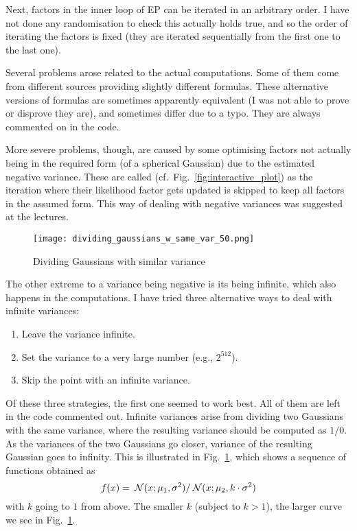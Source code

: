 \documentclass[11pt]{article}
\begin{document}
Next, factors in the inner loop of EP can be iterated in an arbitrary 
order. I have not done any randomisation to check this actually holds true, 
and so the order of iterating the factors is fixed (they are iterated 
sequentially from the first one to the last one).

Several problems arose related to the actual computations. Some of them 
come from different sources providing slightly different formulas. These 
alternative versions of formulas are sometimes apparently equivalent (I was 
not able to prove or disprove they are), and sometimes differ due to 
a typo. They are always commented on in the code.

More severe problems, though, are caused by some optimising factors not 
actually being in the required form (of a spherical Gaussian) due to the 
estimated negative variance. These are called  (cf.\ 
Fig.~\ref{fig:interactive_plot}) as the iteration where their likelihood 
factor gets updated is skipped to keep all factors in the assumed form.  
This way of dealing with negative variances was suggested at the lectures.

\begin{figure}
	\centering
	\texttt{[image: dividing\_gaussians\_w\_same\_var\_50.png]}
	\caption{Dividing Gaussians with similar variance}
	\label{fig:dividing_gaussians}
\end{figure}

The other extreme to a variance being negative is its being infinite, which 
also happens in the computations. I have tried three alternative ways to 
deal with infinite variances:
\begin{enumerate}
	\item Leave the variance infinite.
	\item Set the variance to a very large number (e.g., $2^{512}$).
	\item Skip the point with an infinite variance.
\end{enumerate}
Of these three strategies, the first one seemed to work best. All of them 
are left in the code commented out. Infinite variances arise from dividing 
two Gaussians with the same variance, where the resulting variance should 
be computed as $1/0$. As the variances of the two Gaussians go 
closer, variance of the resulting Gaussian goes to infinity.  This is 
illustrated in Fig.~\ref{fig:dividing_gaussians}, which shows 
a sequence of functions obtained as
\begin{equation}
	f(x) = \:\mathcal{N}(x; \mu_1, \sigma^2) / \:\mathcal{N}(x; \mu_2, k \cdot \sigma^2)
\end{equation}
with $k$ going to $1$ from above. The smaller $k$ (subject to $k > 1$), the 
larger curve we see in Fig.~\ref{fig:dividing_gaussians}.
\end{document}
